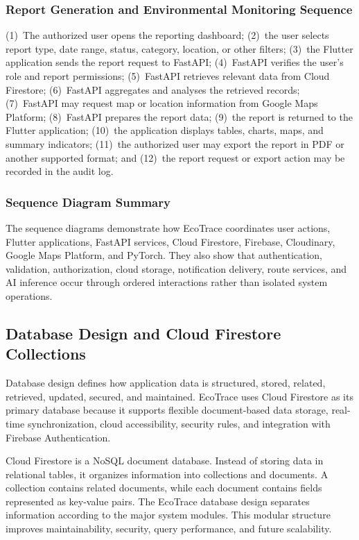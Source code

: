 \subsubsection{Report Generation and Environmental Monitoring Sequence}
(1)~The authorized user opens the reporting dashboard; (2)~the user selects
report type, date range, status, category, location, or other filters; (3)~the
Flutter application sends the report request to FastAPI; (4)~FastAPI verifies
the user's role and report permissions; (5)~FastAPI retrieves relevant data
from Cloud Firestore; (6)~FastAPI aggregates and analyses the retrieved
records; (7)~FastAPI may request map or location information from Google
Maps Platform; (8)~FastAPI prepares the report data; (9)~the report is
returned to the Flutter application; (10)~the application displays tables,
charts, maps, and summary indicators; (11)~the authorized user may export
the report in PDF or another supported format; and (12)~the report request or
export action may be recorded in the audit log.

\subsubsection{Sequence Diagram Summary}
The sequence diagrams demonstrate how EcoTrace coordinates user actions,
Flutter applications, FastAPI services, Cloud Firestore, Firebase, Cloudinary,
Google Maps Platform, and PyTorch. They also show that authentication,
validation, authorization, cloud storage, notification delivery, route services,
and AI inference occur through ordered interactions rather than isolated
system operations.

\subsection{Database Design and Cloud Firestore Collections}

Database design defines how application data is structured, stored, related,
retrieved, updated, secured, and maintained. EcoTrace uses Cloud Firestore as
its primary database because it supports flexible document-based data
storage, real-time synchronization, cloud accessibility, security rules, and
integration with Firebase Authentication.

Cloud Firestore is a NoSQL document database. Instead of storing data in
relational tables, it organizes information into collections and documents. A
collection contains related documents, while each document contains fields
represented as key-value pairs. The EcoTrace database design separates
information according to the major system modules. This modular structure
improves maintainability, security, query performance, and future scalability.

